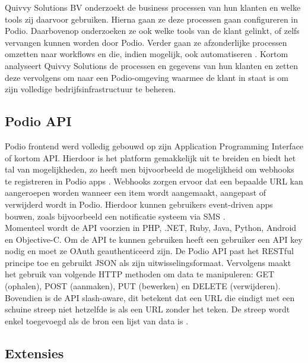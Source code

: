 Quivvy Solutions BV onderzoekt de business processen van hun klanten en welke tools zij daarvoor gebruiken. Hierna gaan ze deze processen gaan configureren in Podio. Daarbovenop onderzoeken ze ook welke tools van de klant gelinkt, of zelfs vervangen kunnen worden door Podio. Verder gaan ze afzonderlijke processen omzetten naar workflows en die, indien mogelijk, ook automatiseren \autocite{QuivvySoftware}. Kortom analyseert Quivvy Solutions de processen en gegevens van hun klanten en zetten deze vervolgens om naar een Podio-omgeving waarmee de klant in staat is om zijn volledige bedrijfsinfrastructuur te beheren. \\

\subsection{Podio API}
\label{subsec:podio_API}


Podio frontend werd volledig gebouwd op zijn Application Programming Interface of kortom API. Hierdoor is het platform gemakkelijk uit te breiden en biedt het tal van mogelijkheden, zo heeft men bijvoorbeeld de mogelijkheid om webhooks te registreren in Podio apps \autocite{PodioAPI2023}. Webhooks zorgen ervoor dat een bepaalde URL kan aangeroepen worden wanneer een item wordt aangemaakt, aangepast of verwijderd wordt in Podio. Hierdoor kunnen gebruikers event-driven apps bouwen, zoals bijvoorbeeld een notificatie systeem via SMS \autocite{PodioAPIWebhooks}. \\

Momenteel wordt de API voorzien in PHP, .NET, Ruby, Java, Python, Android en Objective-C. Om de API te kunnen gebruiken heeft een gebruiker een API key nodig en moet ze OAuth geauthenticeerd zijn. De Podio API past het RESTful principe toe en gebruikt JSON als zijn uitwisselingsformaat. Vervolgens maakt het gebruik van volgende HTTP methoden om data te manipuleren: GET (ophalen), POST (aanmaken), PUT (bewerken) en DELETE (verwijderen). Bovendien is de API slash-aware, dit betekent dat een URL die eindigt met een schuine streep niet hetzelfde is als een URL zonder het teken. De streep wordt enkel toegevoegd als de bron een lijst van data is \autocite{PodioAPIConcepts}. \\


\subsection{Extensies}
\label{subsec:podio_extensies}


